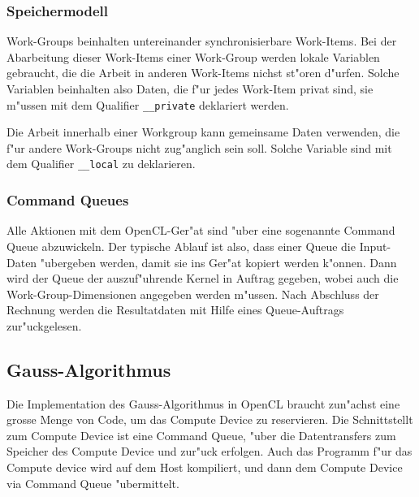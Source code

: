 \subsubsection{Speichermodell}
Work-Groups beinhalten untereinander synchronisierbare Work-Items.
Bei der Abarbeitung dieser Work-Items einer Work-Group werden
lokale Variablen gebraucht,
die die Arbeit in anderen Work-Items nichst st"oren d"urfen.
Solche Variablen beinhalten also Daten, die f"ur jedes Work-Item
privat sind, sie m"ussen mit dem Qualifier \verb+__private+
deklariert werden.

Die Arbeit innerhalb einer Workgroup kann gemeinsame Daten verwenden,
die f"ur andere Work-Groups nicht zug"anglich sein soll.
Solche Variable sind mit dem Qualifier \verb+__local+ zu
deklarieren.

\subsubsection{Command Queues}
Alle Aktionen mit dem OpenCL-Ger"at sind "uber eine sogenannte
Command Queue abzuwickeln. Der typische Ablauf ist also, dass einer
Queue die Input-Daten "ubergeben werden, damit sie ins Ger"at
kopiert werden k"onnen. Dann wird der Queue der auszuf"uhrende
Kernel in Auftrag gegeben, wobei auch die Work-Group-Dimensionen
angegeben werden m"ussen. Nach Abschluss der Rechnung werden die
Resultatdaten mit Hilfe eines Queue-Auftrags zur"uckgelesen.

\subsection{Gauss-Algorithmus}
Die Implementation des Gauss-Algorithmus in OpenCL braucht zun"achst eine
grosse Menge von Code, um das Compute Device zu reservieren.
Die Schnittstellt zum Compute Device ist eine Command Queue,
"uber die Datentransfers zum Speicher des Compute Device und zur"uck
erfolgen.
Auch das Programm f"ur das Compute device wird auf dem
Host kompiliert, und dann dem Compute Device via Command Queue
"ubermittelt.

